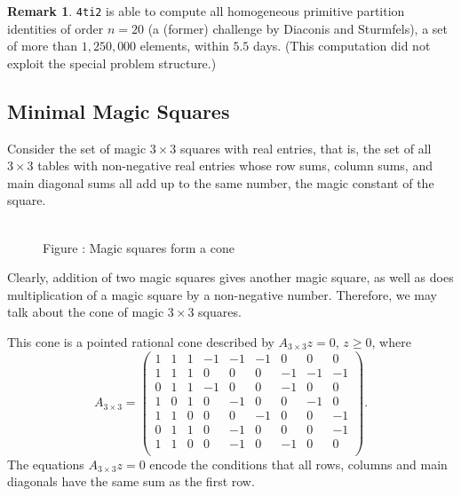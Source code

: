 \documentclass[12pt]{article}
\theoremstyle{definition}
\newtheorem*{Remark}{Remark}
\newcommand{\FourTiTwo}{{\tt 4ti2}}
\begin{document}
\begin{Remark}
  \FourTiTwo{} is able to compute all homogeneous primitive partition
  identities of order $n=20$ (a (former) challenge by Diaconis and
  Sturmfels), a set of more than $1,250,000$ elements, within $5.5$
  days. (This computation did not exploit
  the special problem structure.)
\end{Remark}







\subsection{Minimal Magic Squares}
Consider the set of magic $3\times 3$ squares with real entries, that
is, the set of all $3\times 3$ tables with non-negative real entries
whose row sums, column sums, and main diagonal sums all add up to the same
number, the magic constant of the square. 

\begin{figure}[tbh]
\begin{center}
\\[.3cm]
 \label{Cone3x3} Figure \thefigure: Magic
squares form a cone
\end{center}
\vspace*{-0.3cm}
\end{figure}

Clearly, addition of two magic squares gives another magic square,
as well as does multiplication of a magic square by a non-negative
number. Therefore, we may talk about the cone of magic $3\times 3$
squares.

This cone is a pointed rational cone described by 
$A_{3\times 3}z=0$, $z\geq 0$, where
\[
A_{3\times 3}=
\left(
\begin{array}{rrrrrrrrr}
1 & 1 & 1 & -1 & -1 & -1 &  0 &  0 &  0\\
1 & 1 & 1 &  0 &  0 &  0 & -1 & -1 & -1\\
0 & 1 & 1 & -1 &  0 &  0 & -1 &  0 &  0\\
1 & 0 & 1 &  0 & -1 &  0 &  0 & -1 &  0\\
1 & 1 & 0 &  0 &  0 & -1 &  0 &  0 & -1\\
0 & 1 & 1 &  0 & -1 &  0 &  0 &  0 & -1\\
1 & 1 & 0 &  0 & -1 &  0 & -1 &  0 &  0\\
\end{array}
\right).
\]
The equations $A_{3\times 3}z=0$ encode the conditions that all
rows, columns and main diagonals have the same sum as the first
row.
\end{document}
